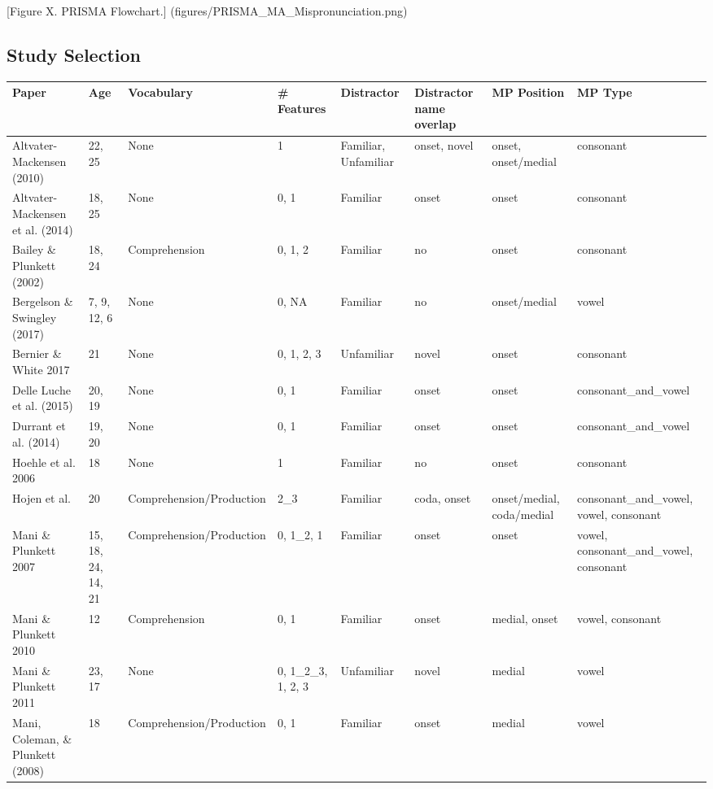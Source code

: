 \documentclass[man]{apa6}
\theoremstyle{definition}
\theoremstyle{definition}
\theoremstyle{definition}
\theoremstyle{remark}
\begin{document}
{[}Figure X. PRISMA Flowchart.{]}
(figures/PRISMA\_MA\_Mispronunciation.png)

\subsection{Study Selection}\label{study-selection}

\begin{tabular}{l|l|l|l|l|l|l|l}
\hline
Paper & Age & Vocabulary & \# Features & Distractor & Distractor name overlap & MP Position & MP Type\\
\hline
Altvater-Mackensen (2010) & 22, 25 & None & 1 & Familiar, Unfamiliar & onset, novel & onset, onset/medial & consonant\\
\hline
Altvater-Mackensen et al. (2014) & 18, 25 & None & 0, 1 & Familiar & onset & onset & consonant\\
\hline
Bailey \& Plunkett (2002) & 18, 24 & Comprehension & 0, 1, 2 & Familiar & no & onset & consonant\\
\hline
Bergelson \& Swingley (2017) & 7, 9, 12, 6 & None & 0, NA & Familiar & no & onset/medial & vowel\\
\hline
Bernier \& White 2017 & 21 & None & 0, 1, 2, 3 & Unfamiliar & novel & onset & consonant\\
\hline
Delle Luche et al. (2015) & 20, 19 & None & 0, 1 & Familiar & onset & onset & consonant\_and\_vowel\\
\hline
Durrant et al. (2014) & 19, 20 & None & 0, 1 & Familiar & onset & onset & consonant\_and\_vowel\\
\hline
Hoehle et al. 2006 & 18 & None & 1 & Familiar & no & onset & consonant\\
\hline
Hojen et al. & 20 & Comprehension/Production & 2\_3 & Familiar & coda, onset & onset/medial, coda/medial & consonant\_and\_vowel, vowel, consonant\\
\hline
Mani \& Plunkett 2007 & 15, 18, 24, 14, 21 & Comprehension/Production & 0, 1\_2, 1 & Familiar & onset & onset & vowel, consonant\_and\_vowel, consonant\\
\hline
Mani \& Plunkett 2010 & 12 & Comprehension & 0, 1 & Familiar & onset & medial, onset & vowel, consonant\\
\hline
Mani \& Plunkett 2011 & 23, 17 & None & 0, 1\_2\_3, 1, 2, 3 & Unfamiliar & novel & medial & vowel\\
\hline
Mani, Coleman, \& Plunkett (2008) & 18 & Comprehension/Production & 0, 1 & Familiar & onset & medial & vowel\\

\end{tabular}
\end{document}
